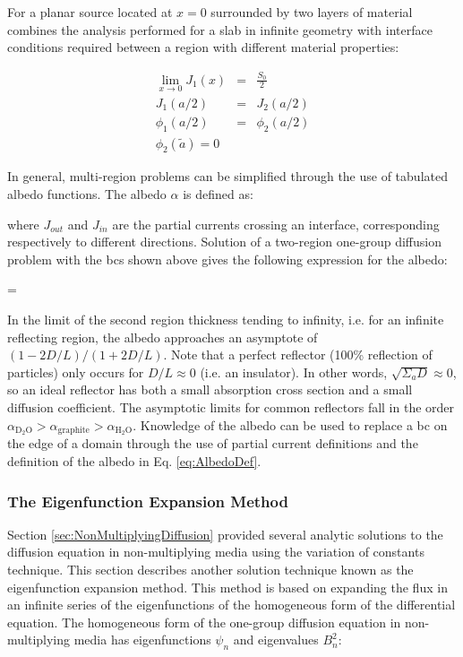 For a planar source located at \(x=0\) surrounded by two layers of material combines the analysis performed for a slab in infinite geometry with interface conditions required between a region with different material properties:

\begin{subequations}
\begin{eqnarray}
\lim_{x\rightarrow0}J_1(x)&=&\frac{S_0}{2}\\
J_1(a/2)&=&J_2(a/2)\\
\phi_1(a/2)&=&\phi_2(a/2)\\
\phi_2(\tilde{a})=0
\end{eqnarray}
\end{subequations}

In general, multi-region problems can be simplified through the use of tabulated albedo functions. The albedo \(\alpha\) is defined as:

\beq
\label{eq:AlbedoDef}
\alpha\equiv{}
\eeq

where \(J_{out}\) and \(J_{in}\) are the partial currents crossing an interface, corresponding respectively to different directions. Solution of a two-region one-group diffusion problem with the \glspl{bc} shown above gives the following expression for the albedo:

\beq
\alpha=
\eeq

In the limit of the second region thickness tending to infinity, i.e. for an infinite reflecting region, the albedo approaches an asymptote of \((1-2D/L)/(1+2D/L)\). Note that a perfect reflector (100\% reflection of particles) only occurs for \(D/L\approx0\) (i.e. an insulator). In other words, \(\sqrt{\Sigma_aD}\approx0\), so an ideal reflector has both a small absorption cross section and a small diffusion coefficient. The asymptotic limits for common reflectors fall in the order \(\alpha_{\text{D$_2$O}}>\alpha_{\text{graphite}}>\alpha_{\text{H$_2$O}}\). Knowledge of the albedo can be used to replace a \gls{bc} on the edge of a domain through the use of partial current definitions and the definition of the albedo in Eq. \eqref{eq:AlbedoDef}.

\subsubsection{The Eigenfunction Expansion Method}

Section \ref{sec:NonMultiplyingDiffusion} provided several analytic solutions to the diffusion equation in non-multiplying media using the variation of constants technique. This section describes another solution technique known as the eigenfunction expansion method. This method is based on expanding the flux in an infinite series of the eigenfunctions of the homogeneous form of the differential equation. The homogeneous form of the one-group diffusion equation in non-multiplying media has eigenfunctions \(\psi_n\) and eigenvalues \(B_n^2\):

